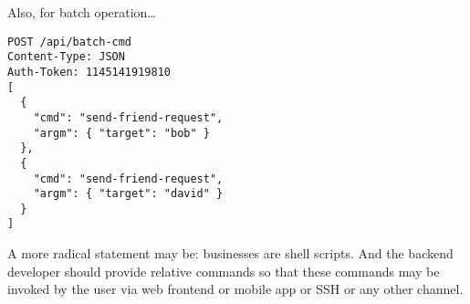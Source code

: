 Also, for batch operation\ldots

\begin{lstlisting}
POST /api/batch-cmd
Content-Type: JSON
Auth-Token: 1145141919810
[
  {
    "cmd": "send-friend-request",
    "argm": { "target": "bob" }
  },
  {
    "cmd": "send-friend-request",
    "argm": { "target": "david" }
  }
]
\end{lstlisting}

A more radical statement may be: businesses are shell scripts.
And the backend developer should provide relative commands
so that these commands may be invoked by the user
via web frontend or mobile app or SSH or any other channel.


